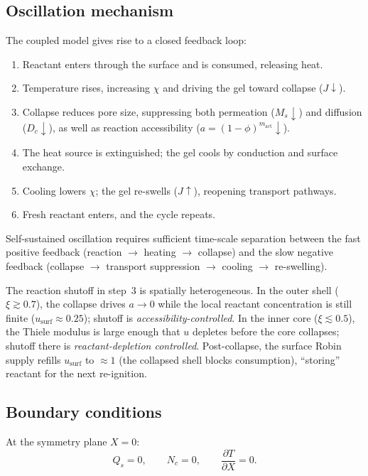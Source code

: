 \documentclass[aps,pre,reprint,superscriptaddress,longbibliography,floatfix]{revtex4-2}
\begin{document}
\subsection{Oscillation mechanism}

The coupled model gives rise to a closed feedback loop:
\begin{enumerate}
  \item Reactant enters through the surface and is consumed, releasing heat.
  \item Temperature rises, increasing $\chi$ and driving the gel toward collapse ($J\downarrow$).
  \item Collapse reduces pore size, suppressing both permeation ($M_s\downarrow$) and diffusion ($D_c\downarrow$), as well as reaction accessibility ($a=(1-\phi)^{m_\mathrm{act}}\downarrow$).
  \item The heat source is extinguished; the gel cools by conduction and surface exchange.
  \item Cooling lowers $\chi$; the gel re-swells ($J\uparrow$), reopening transport pathways.
  \item Fresh reactant enters, and the cycle repeats.
\end{enumerate}
Self-sustained oscillation requires sufficient time-scale separation between the fast positive feedback (reaction $\to$ heating $\to$ collapse) and the slow negative feedback (collapse $\to$ transport suppression $\to$ cooling $\to$ re-swelling).

The reaction shutoff in step~3 is spatially heterogeneous. In the outer
shell ($\xi\gtrsim 0.7$), the collapse drives $a\to 0$ while the local
reactant concentration is still finite ($u_\mathrm{surf}\approx 0.25$);
shutoff is \emph{accessibility-controlled}. In the inner core
($\xi\lesssim 0.5$), the Thiele modulus is large enough that $u$ depletes
before the core collapses; shutoff there is \emph{reactant-depletion
controlled}. Post-collapse, the surface Robin supply refills $u_\mathrm{surf}$
to $\approx 1$ (the collapsed shell blocks consumption), ``storing'' reactant
for the next re-ignition.

\subsection{Boundary conditions}

At the symmetry plane $X=0$:
\begin{equation}
  Q_s = 0, \qquad N_c = 0, \qquad \frac{\partial T}{\partial X} = 0.
  \label{eq:bc_sym}
\end{equation}
\end{document}
